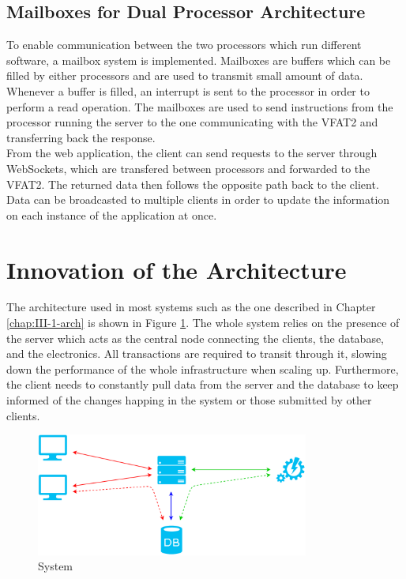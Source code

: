     \subsection{Mailboxes for Dual Processor Architecture}

      To enable communication between the two processors which run different software, a mailbox system is implemented. Mailboxes are buffers which can be filled by either processors and are used to transmit small amount of data. Whenever a buffer is filled, an interrupt is sent to the processor in order to perform a read operation. The mailboxes are used to send instructions from the processor running the server to the one communicating with the VFAT2 and transferring back the response. \\

      From the web application, the client can send requests to the server through WebSockets, which are transfered between processors and forwarded to the VFAT2. The returned data then follows the opposite path back to the client. Data can be broadcasted to multiple clients in order to update the information on each instance of the application at once.

  \section{Innovation of the Architecture}

    The architecture used in most systems such as the one described in Chapter \ref{chap:III-1-arch} is shown in Figure \ref{fig:III-2-system-old}. The whole system relies on the presence of the server which acts as the central node connecting the clients, the database, and the electronics. All transactions are required to transit through it, slowing down the performance of the whole infrastructure when scaling up. Furthermore, the client needs to constantly pull data from the server and the database to keep informed of the changes happing in the system or those submitted by other clients. \\

    \begin{figure}[h!]
      \centering
      \includegraphics[width=0.8\textwidth]{img/III-2-web-daq/old-sys.png}
      \caption{System}
      \label{fig:III-2-system-old}
    \end{figure}

